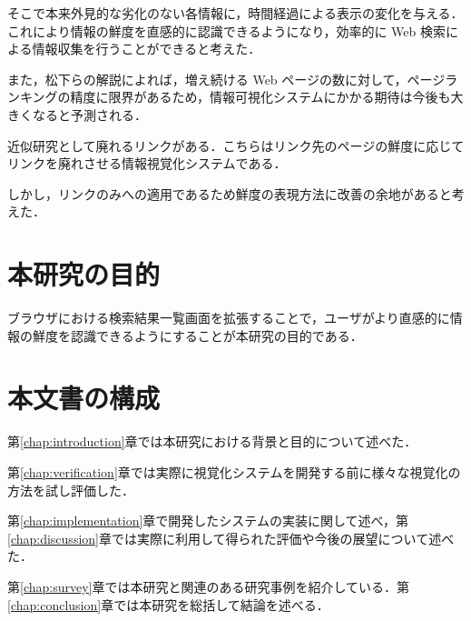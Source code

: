 そこで本来外見的な劣化のない各情報に，時間経過による表示の変化を与える．これにより情報の鮮度を直感的に認識できるようになり，効率的に Web 検索による情報収集を行うことができると考えた．

また，松下\cite{tecvisinfo}らの解説によれば，増え続ける Web ページの数に対して，ページランキングの精度に限界があるため，情報可視化システムにかかる期待は今後も大きくなると予測される．

近似研究として廃れるリンク\cite{dyinglink}がある．こちらはリンク先のページの鮮度に応じてリンクを廃れさせる情報視覚化システムである．

しかし，リンクのみへの適用であるため鮮度の表現方法に改善の余地があると考えた．

\section{本研究の目的}

ブラウザにおける検索結果一覧画面を拡張することで，ユーザがより直感的に情報の鮮度を認識できるようにすることが本研究の目的である．

\section{本文書の構成}

第\ref{chap:introduction}章では本研究における背景と目的について述べた．

第\ref{chap:verification}章では実際に視覚化システムを開発する前に様々な視覚化の方法を試し評価した．

第\ref{chap:implementation}章で開発したシステムの実装に関して述べ，第\ref{chap:discussion}章では実際に利用して得られた評価や今後の展望について述べた．

第\ref{chap:survey}章では本研究と関連のある研究事例を紹介している．第\ref{chap:conclusion}章では本研究を総括して結論を述べる．
